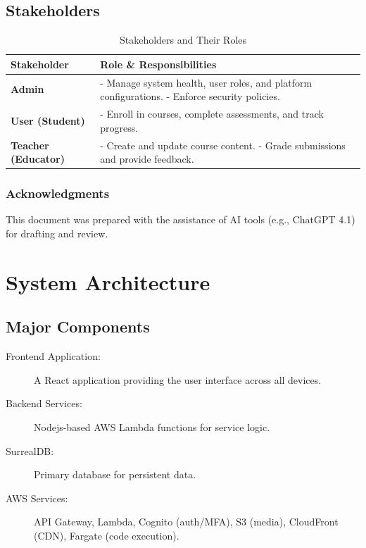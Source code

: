 \documentclass[a4paper, 11pt]{scrreprt}
\begin{document}
\section{Stakeholders}
\begin{table}[htbp]\setlength{\abovecaptionskip}{0pt}
    \centering
    \begin{tabularx}{\textwidth}{|l|X|}
        \hline
        \textbf{Stakeholder} & \textbf{Role \& Responsibilities} \\
        \hline
        \textbf{Admin} & - Manage system health, user roles, and platform configurations. \newline - Enforce security policies. \\
        \hline
        \textbf{User (Student)} & - Enroll in courses, complete assessments, and track progress. \\
        \hline
        \textbf{Teacher (Educator)} & - Create and update course content. \newline - Grade submissions and provide feedback. \\
        \hline
    \end{tabularx}
    \caption{Stakeholders and Their Roles}
\end{table}

\subsection{Acknowledgments}
This document was prepared with the assistance of AI tools (e.g., ChatGPT 4.1) for drafting and review.

\chapter{System Architecture}

\section{Major Components}

\begin{description}
    \item[Frontend Application:] A React application providing the user interface across all devices.
    \item[Backend Services:] Nodejs-based AWS Lambda functions for service logic.
    \item[SurrealDB:] Primary database for persistent data.
    \item[AWS Services:] API Gateway, Lambda, Cognito (auth/MFA), S3 (media), CloudFront (CDN), Fargate (code execution).
\end{description}
\end{document}
